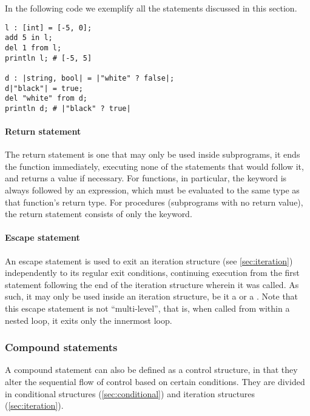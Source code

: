 
In the following code we exemplify all the statements discussed in this section.
\begin{lstlisting}[language=Gryph]
l : [int] = [-5, 0];
add 5 in l;
del 1 from l;
println l; # [-5, 5]

d : |string, bool| = |"white" ? false|;
d|"black"| = true;
del "white" from d;
println d; # |"black" ? true|
\end{lstlisting}

\paragraph{Return statement}
\label{sec:return}
The return statement is one that may only be used inside subprograms, it ends the function immediately, executing none of the statements that would follow it, and returns a value if necessary. For functions, in particular, the  keyword is always followed by an expression, which must be evaluated to the same type as that function's return type. For procedures (subprograms with no return value), the return statement consists of only the  keyword.

\paragraph{Escape statement}
\label{sec:escape}
An escape statement is used to exit an iteration structure (see \ref{sec:iteration}) independently to its regular exit conditions, continuing execution from the first statement following the end of the iteration structure wherein it was called. As such, it may only be used inside an iteration structure, be it a  or a . Note that this escape statement is not ``multi-level'', that is, when called from within a nested loop, it exits only the innermost loop.

\subsubsection{Compound statements}
\label{sec:compound-stmts}
A compound statement can also be defined as a control structure, in that they alter the sequential flow of control based on certain conditions. They are divided in conditional structures (\ref{sec:conditional}) and iteration structures (\ref{sec:iteration}).

